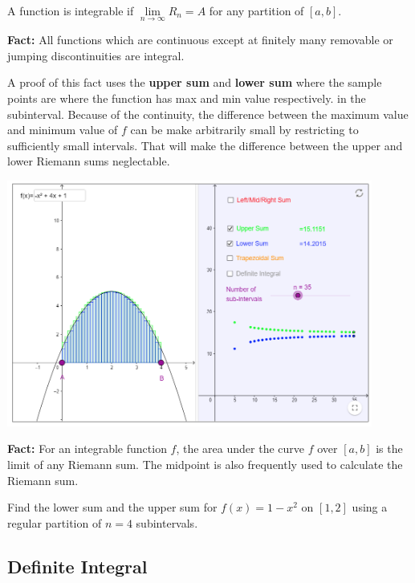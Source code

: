 \begin{definition}

A function is integrable if \(\lim\limits_{n\to \infty}R_n=A\) for any
partition of \([a, b]\).

\end{definition}

\textbf{Fact:} All functions which are continuous except at finitely
many removable or jumping discontinuities are integral.

A proof of this fact uses the \textbf{upper sum} and \textbf{lower sum}
where the sample points are where the function has max and min value
respectively. in the subinterval. Because of the continuity, the
difference between the maximum value and minimum value of \(f\) can be
make arbitrarily small by restricting to sufficiently small intervals.
That will make the difference between the upper and lower Riemann sums
neglectable.

\includegraphics[width=0.9\textwidth]{img/image-20200422234550315.png}

\textbf{Fact:} For an integrable function \(f\), the area under the
curve \(f\) over \([a, b]\) is the limit of any Riemann sum. The
midpoint is also frequently used to calculate the Riemann sum.

\begin{example}

Find the lower sum and the upper sum for \(f(x)=1 - x^2\) on \([1,2]\)
using a regular partition of \(n=4\) subintervals.

\end{example}
\vspace*{6\baselineskip}

\hypertarget{definite-integral}{%
\subsection{Definite Integral}\label{definite-integral}}

